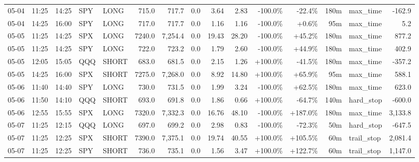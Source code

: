\documentclass[11pt,a4paper,twoside]{article}
\begin{document}
\begin{landscape}
\begin{center}
\begin{longtable}{>{\color{txtmain}}l l l l l r r r r r r r r >{\color{txtmain}}l r}
05-04 & 11:25 & 14:25 & SPY & LONG & 715.0 & 717.7 & 0.0 & 3.64 & 2.83 & \textcolor{lossred}{-100.0\%} & \textcolor{lossred}{-22.4\%} & 180m & max\_time & \textcolor{lossred}{-162.9} \\
05-04 & 14:25 & 16:00 & SPY & LONG & 717.0 & 717.7 & 0.0 & 1.16 & 1.16 & \textcolor{lossred}{-100.0\%} & \textcolor{wingreen}{+0.6\%} & 95m & max\_time & \textcolor{wingreen}{5.2} \\
05-05 & 11:25 & 14:25 & SPX & LONG & 7240.0 & 7,254.4 & 0.0 & 19.43 & 28.20 & \textcolor{lossred}{-100.0\%} & \textcolor{wingreen}{+45.2\%} & 180m & max\_time & \textcolor{wingreen}{877.2} \\
05-05 & 11:25 & 14:25 & SPY & LONG & 722.0 & 723.2 & 0.0 & 1.79 & 2.60 & \textcolor{lossred}{-100.0\%} & \textcolor{wingreen}{+44.9\%} & 180m & max\_time & \textcolor{wingreen}{402.9} \\
05-05 & 12:05 & 15:05 & QQQ & SHORT & 683.0 & 681.5 & 0.0 & 2.15 & 1.26 & \textcolor{wingreen}{+100.0\%} & \textcolor{lossred}{-41.5\%} & 180m & max\_time & \textcolor{lossred}{-357.2} \\
05-05 & 14:25 & 16:00 & SPX & SHORT & 7275.0 & 7,268.0 & 0.0 & 8.92 & 14.80 & \textcolor{wingreen}{+100.0\%} & \textcolor{wingreen}{+65.9\%} & 95m & max\_time & \textcolor{wingreen}{588.1} \\
05-06 & 11:40 & 14:40 & SPY & LONG & 730.0 & 731.5 & 0.0 & 1.99 & 3.24 & \textcolor{lossred}{-100.0\%} & \textcolor{wingreen}{+62.5\%} & 180m & max\_time & \textcolor{wingreen}{623.0} \\
05-06 & 11:50 & 14:10 & QQQ & SHORT & 693.0 & 691.8 & 0.0 & 1.86 & 0.66 & \textcolor{wingreen}{+100.0\%} & \textcolor{lossred}{-64.7\%} & 140m & hard\_stop & \textcolor{lossred}{-600.0} \\
05-06 & 12:55 & 15:55 & SPX & LONG & 7320.0 & 7,332.3 & 0.0 & 16.76 & 48.10 & \textcolor{lossred}{-100.0\%} & \textcolor{wingreen}{+187.0\%} & 180m & max\_time & \textcolor{wingreen}{3,133.8} \\
05-07 & 11:25 & 12:15 & QQQ & LONG & 697.0 & 699.2 & 0.0 & 2.98 & 0.83 & \textcolor{lossred}{-100.0\%} & \textcolor{lossred}{-72.3\%} & 50m & hard\_stop & \textcolor{lossred}{-647.5} \\
05-07 & 11:25 & 12:25 & SPX & SHORT & 7390.0 & 7,375.1 & 0.0 & 19.74 & 40.55 & \textcolor{wingreen}{+100.0\%} & \textcolor{wingreen}{+105.5\%} & 60m & trail\_stop & \textcolor{wingreen}{2,081.4} \\
05-07 & 11:25 & 12:25 & SPY & SHORT & 736.0 & 735.1 & 0.0 & 1.56 & 3.47 & \textcolor{wingreen}{+100.0\%} & \textcolor{wingreen}{+122.7\%} & 60m & trail\_stop & \textcolor{wingreen}{1,147.0} \\

\end{longtable}
\end{center}
\end{landscape}
\end{document}
